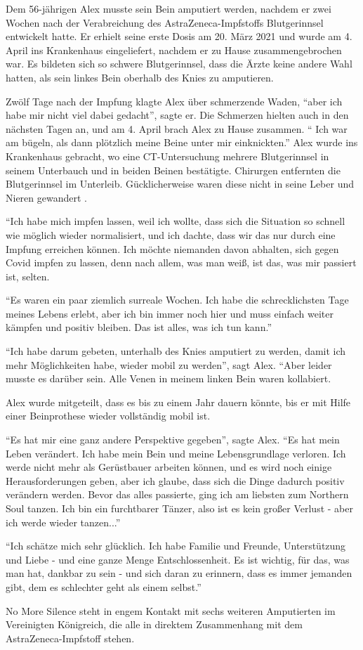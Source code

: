 Dem 56-jährigen Alex musste sein Bein amputiert werden, nachdem er zwei Wochen
nach der Verabreichung des AstraZeneca-Impfstoffs Blutgerinnsel entwickelt
hatte. Er erhielt seine erste Dosis am 20. März 2021 und wurde am 4. April ins
Krankenhaus eingeliefert, nachdem er zu Hause zusammengebrochen war. Es bildeten
sich so schwere Blutgerinnsel, dass die Ärzte keine andere Wahl hatten, als sein
linkes Bein oberhalb des Knies zu amputieren.

Zwölf Tage nach der Impfung klagte Alex über schmerzende Waden, ``aber ich habe
mir nicht viel dabei gedacht'', sagte er. Die Schmerzen hielten auch in den
nächsten Tagen an, und am 4. April brach Alex zu Hause zusammen. `` Ich war am
bügeln, als dann plötzlich meine Beine unter mir einknickten.'' Alex wurde ins
Krankenhaus gebracht, wo eine CT-Untersuchung mehrere Blutgerinnsel in seinem
Unterbauch und in beiden Beinen bestätigte. Chirurgen entfernten die
Blutgerinnsel im Unterleib. Gücklicherweise waren diese nicht in seine Leber und
Nieren gewandert .

``Ich habe mich impfen lassen, weil ich wollte, dass sich die Situation so
schnell wie möglich wieder normalisiert, und ich dachte, dass wir das nur durch
eine Impfung erreichen können. Ich möchte niemanden davon abhalten, sich gegen
Covid impfen zu lassen, denn nach allem, was man weiß, ist das, was mir passiert
ist, selten.

``Es waren ein paar ziemlich surreale Wochen. Ich habe die schrecklichsten Tage
meines Lebens erlebt, aber ich bin immer noch hier und muss einfach weiter
kämpfen und positiv bleiben. Das ist alles, was ich tun kann.''

``Ich habe darum gebeten, unterhalb des Knies amputiert zu werden, damit ich
mehr Möglichkeiten habe, wieder mobil zu werden'', sagt Alex. ``Aber leider
musste es darüber sein. Alle Venen in meinem linken Bein waren kollabiert.

Alex wurde mitgeteilt, dass es bis zu einem Jahr dauern könnte, bis er mit Hilfe einer Beinprothese wieder vollständig mobil ist.

``Es hat mir eine ganz andere Perspektive gegeben'', sagte Alex. ``Es hat mein
Leben verändert. Ich habe mein Bein und meine Lebensgrundlage verloren. Ich
werde nicht mehr als Gerüstbauer arbeiten können, und es wird noch einige
Herausforderungen geben, aber ich glaube, dass sich die Dinge dadurch positiv
verändern werden. Bevor das alles passierte, ging ich am liebsten zum Northern
Soul tanzen. Ich bin ein furchtbarer Tänzer, also ist es kein großer Verlust -
aber ich werde wieder tanzen...''

``Ich schätze mich sehr glücklich. Ich habe Familie und Freunde, Unterstützung
und Liebe - und eine ganze Menge Entschlossenheit. Es ist wichtig, für das, was
man hat, dankbar zu sein - und sich daran zu erinnern, dass es immer jemanden
gibt, dem es schlechter geht als einem selbst.''

No More Silence steht in engem Kontakt mit sechs weiteren Amputierten im
Vereinigten Königreich, die alle in direktem Zusammenhang mit dem
AstraZeneca-Impfstoff stehen.

